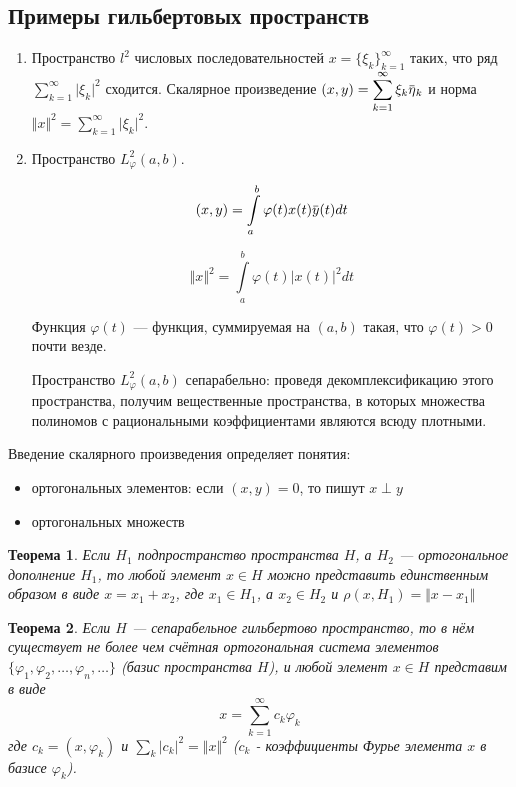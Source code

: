 \documentclass[12pt,a4paper,titlepage,oneside]{book}
\newcommand{\overbar}[1]{\mkern 1.5mu\overline{\mkern-1.5mu#1\mkern-1.5mu}\mkern 1.5mu}
\theoremstyle{definition}
\theoremstyle{plain}
\newtheorem*{theorem}{Теорема}
\theoremstyle{break}
\theoremstyle{remark}
\theoremstyle{remark}
\theoremstyle{remark}
\theoremstyle{remark}
\theoremstyle{plain}
\theoremstyle{plain}
\begin{document}
\subsection*{Примеры гильбертовых пространств}

\begin{enumerate}
	\item Пространство $l^2$ числовых последовательностей $x = \lbrace \xi_k \rbrace_{k=1}^{\infty}$ таких, что ряд $\displaystyle\sum_{k=1}^{\infty} \lvert \xi_k \rvert^2$ сходится. Скалярное произведение $(x, y) = \displaystyle\sum_{k=1}^{\infty} \xi_k \overbar{\eta}_k$ и норма $\Vert x \Vert^2 = \displaystyle\sum_{k=1}^{\infty} \lvert \xi_k \rvert^2$.
	
	\item Пространство $L_{\varphi}^2 (a, b)$.
	
	$$ (x, y) = \displaystyle\int\limits_a^b \varphi(t) x(t) \overbar{y}(t) dt$$
	
	$$ \Vert x \Vert^2 = \displaystyle\int\limits_a^b \varphi(t) \lvert x(t) \rvert^2 dt$$
	
	Функция $\varphi(t)$ --- функция, суммируемая на $(a, b)$ такая, что $\varphi(t) > 0$ почти везде.
	
	Пространство $L_{\varphi}^2 (a, b)$ сепарабельно: проведя декомплексификацию этого пространства, получим вещественные пространства, в которых множества полиномов с рациональными коэффициентами являются всюду плотными.
\end{enumerate}

Введение скалярного произведения определяет понятия:

\begin{itemize}
	\item ортогональных элементов: если $(x, y) = 0$, то пишут $x \perp y$
	
	\item ортогональных множеств
\end{itemize}

\begin{theorem}
	Если $H_1$ подпространство пространства $H$, а $H_2$ --- ортогональное дополнение $H_1$, то любой элемент $x \in H$ можно представить единственным образом в виде $x = x_1 + x_2$, где $x_1 \in H_1$, а $x_2 \in H_2$ и $\rho(x, H_1) = \Vert x - x_1 \Vert$
\end{theorem}

\begin{theorem}
	Если $H$ --- сепарабельное гильбертово пространство, то в нём существует не более чем счётная ортогональная система элементов $\lbrace \varphi_1, \varphi_2, \ldots, \varphi_n, \ldots \rbrace$ (базис пространства $H$), и любой элемент $x \in H$ представим в виде 
	$$x = \displaystyle\sum_{k=1}^{\infty} c_k \varphi_k$$
	где $c_k = (x, \varphi_k)$ и $\displaystyle\sum_{k} \lvert c_k \rvert^2 = \Vert x \Vert^2$ ($c_k$ - коэффициенты Фурье элемента $x$ в базисе $\varphi_k$).
\end{theorem}
\end{document}
